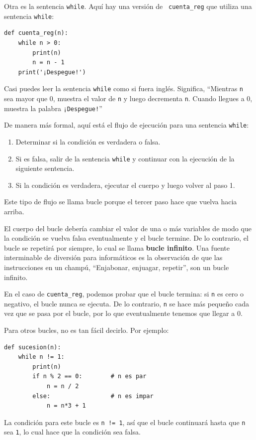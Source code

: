 \documentclass[10pt]{book}
\begin{document}
Otra es la sentencia {\tt while}.  Aquí hay una versión de {\tt
cuenta\_reg} que utiliza una sentencia {\tt while}:

\begin{verbatim}
def cuenta_reg(n):
    while n > 0:
        print(n)
        n = n - 1
    print('¡Despegue!')
\end{verbatim}
%
Casi puedes leer la sentencia {\tt while} como si fuera inglés.
Significa, ``Mientras {\tt n} sea mayor que 0,
muestra el valor de {\tt n} y luego decrementa
{\tt n}.  Cuando llegues a 0, muestra la palabra {\tt ¡Despegue!}''

De manera más formal, aquí está el flujo de ejecución para una sentencia {\tt while}:

\begin{enumerate}

\item Determinar si la condición es verdadera o falsa.

\item Si es falsa, salir de la sentencia {\tt while}
y continuar con la ejecución de la siguiente sentencia.

\item Si la condición es verdadera, ejecutar el
cuerpo y luego volver al paso 1.

\end{enumerate}

Este tipo de flujo se llama bucle porque el tercer paso
hace que vuelva hacia arriba.

El cuerpo del bucle debería cambiar el valor de una o más variables
de modo que la condición se vuelva falsa eventualmente y el bucle
termine.  De lo contrario, el bucle se repetirá por siempre, lo cual se llama
{\bf bucle infinito}.  Una fuente interminable de diversión para
informáticos es la observación de que las instrucciones en un champú,
``Enjabonar, enjuagar, repetir'', son un bucle infinito.

En el caso de {\tt cuenta\_reg}, podemos probar que el bucle
termina: si {\tt n} es cero o negativo, el bucle nunca se ejecuta.
De lo contrario, {\tt n} se hace más pequeño cada vez que se pasa por
el bucle, por lo que eventualmente tenemos que llegar a 0.

Para otros bucles, no es tan fácil decirlo.  Por ejemplo:

\begin{verbatim}
def sucesion(n):
    while n != 1:
        print(n)
        if n % 2 == 0:        # n es par
            n = n / 2
        else:                 # n es impar
            n = n*3 + 1
\end{verbatim}
%
La condición para este bucle es {\tt n != 1}, así que el bucle continuará
hasta que {\tt n} sea {\tt 1}, lo cual hace que la condición sea falsa.
\end{document}
